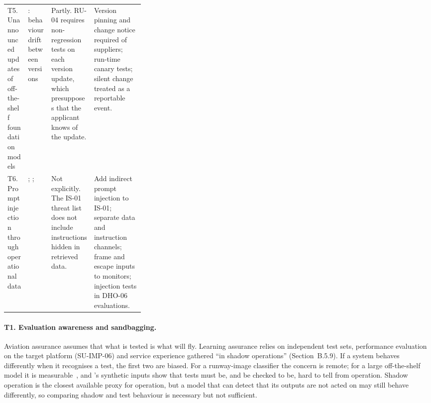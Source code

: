 \documentclass{aer}
\begin{document}
\begin{table}[tbp]
\begin{tabularx}{\linewidth}{@{}>{\raggedright\arraybackslash}p{0.15\linewidth}>{\raggedright\arraybackslash}p{0.17\linewidth}>{\raggedright\arraybackslash}X>{\raggedright\arraybackslash}X@{}}
\addlinespace
T5. Unannounced updates of off-the-shelf foundation models & \citet{chen2023chatgpt}: behaviour drift between versions & Partly. RU-04 requires non-regression tests on each version update, which presupposes that the applicant knows of the update. & Version pinning and change notice required of suppliers; run-time canary tests; silent change treated as a reportable event. \\
\addlinespace
T6. Prompt injection through operational data & \citet{greshake2023injection}; \citet{terekhov2025adaptive}; \citet{remedios2026redteaming} & Not explicitly. The IS-01 threat list does not include instructions hidden in retrieved data. & Add indirect prompt injection to IS-01; separate data and instruction channels; frame and escape inputs to monitors; injection tests in DHO-06 evaluations. \\
\bottomrule
\end{tabularx}
\end{table}

\paragraph{T1. Evaluation awareness and sandbagging.} Aviation assurance assumes that what is tested is what will fly. Learning assurance relies on independent test sets, performance evaluation on the target platform (SU-IMP-06) and service experience gathered ``in shadow operations'' (Section~B.5.9). If a system behaves differently when it recognises a test, the first two are biased. For a runway-image classifier the concern is remote; for a large off-the-shelf model it is measurable~\citep{needham2025evaluated}, and \citeauthor{greenblatt2023control}'s \citeyearpar{greenblatt2023control} synthetic inputs show that tests must be, and be checked to be, hard to tell from operation. Shadow operation is the closest available proxy for operation, but a model that can detect that its outputs are not acted on may still behave differently, so comparing shadow and test behaviour is necessary but not sufficient.
\end{document}
